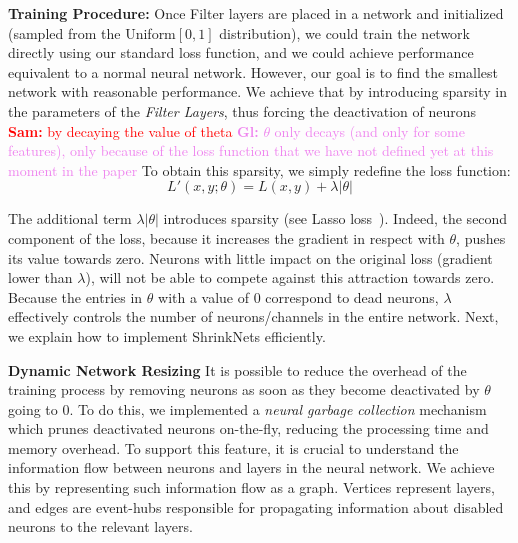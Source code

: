 \documentclass[sigconf]{acmart}
\newcommand{\srm}[1]{\textcolor{red}{{\bf Sam:} #1}}
\newcommand{\gl}[1]{\textcolor{violet}{{\bf Gl:} #1}}
\begin{document}
\textbf{Training Procedure: } Once Filter layers are placed in a network and initialized (sampled from the Uniform$[0, 1]$ distribution),
we could train the network directly using our standard loss function, and we could achieve performance equivalent to a normal neural
network. However, our goal is to find the smallest network with reasonable
performance. We achieve that by introducing sparsity in the parameters of the
\textit{Filter Layers}, thus forcing the deactivation of neurons \srm{by decaying the value of theta} \gl{$\theta$ only decays (and only for some features), only because of the loss function that we have not defined yet at this moment in the paper}
To obtain this sparsity, we simply redefine the loss function:
\vspace{-.5em}
\begin{equation}
  L'(x,y;\theta) = L(x, y) + \lambda|\theta|
\end{equation}

The additional term $\lambda|\theta|$ introduces sparsity (see Lasso
loss~\cite{Tibshirani1996}). 
Indeed, the second component of the loss, because it increases the gradient in
respect with $\theta$, pushes its value towards zero. Neurons with little
impact on the original loss (gradient lower than $\lambda$), will not be able
to compete against this attraction towards zero. Because the entries in
$\theta$ with a value of $0$ correspond to dead neurons, $\lambda$ effectively
controls the number of neurons/channels in the entire network.  Next, we
explain how to implement ShrinkNets efficiently.

\textbf{Dynamic Network Resizing}
It is possible to reduce the overhead of the training process by removing
neurons as soon as they become deactivated by $\theta$ going to 0.
To do this, we implemented a \emph{neural garbage collection} mechanism which
prunes deactivated neurons on-the-fly,  reducing the processing time
and memory overhead. To support this feature, it is crucial to understand the
information flow between neurons and layers in the neural network. We achieve
this by representing such information flow as a graph. Vertices represent layers,
and edges are event-hubs responsible for propagating information about disabled
neurons to the relevant layers.
\end{document}
